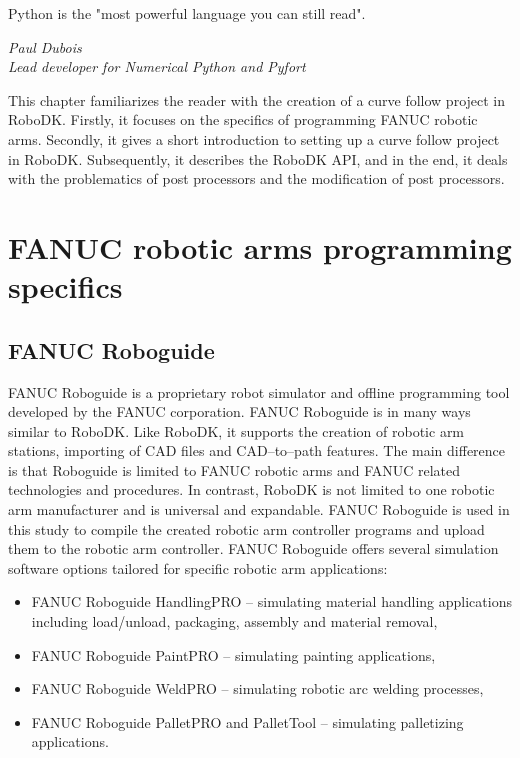 \label{chap:implementation}

\epigraph{Python is the "most powerful language you can still read".}{\textit{Paul Dubois \\ Lead developer for Numerical Python and Pyfort }}

This chapter familiarizes the reader with the creation of a curve follow project in RoboDK. Firstly, it focuses on the specifics of programming FANUC robotic arms. Secondly, it gives a short introduction to setting up a curve follow project in RoboDK. Subsequently, it describes the RoboDK API, and in the end, it deals with the problematics of post processors and the modification of post processors.

\section{FANUC robotic arms programming specifics}

\subsection{FANUC Roboguide}

FANUC Roboguide is a proprietary robot simulator and offline programming tool developed by the FANUC corporation. FANUC Roboguide is in many ways similar to RoboDK.  Like RoboDK, it supports the creation of robotic arm stations, importing of CAD files and CAD--to--path features. The main difference is that Roboguide is limited to FANUC robotic arms and FANUC related technologies and procedures. In contrast, RoboDK is not limited to one robotic arm manufacturer and is universal and expandable. FANUC Roboguide is used in this study to compile the created robotic arm controller programs and upload them to the robotic arm controller. FANUC Roboguide offers several simulation software options tailored for specific robotic arm applications:

\begin{itemize}

\item FANUC Roboguide HandlingPRO -- simulating material handling applications including load/unload, packaging, assembly and material removal,
\item FANUC Roboguide PaintPRO -- simulating painting applications,
\item FANUC Roboguide WeldPRO -- simulating robotic arc welding processes,
\item FANUC Roboguide PalletPRO and PalletTool -- simulating palletizing applications.

\end{itemize}

